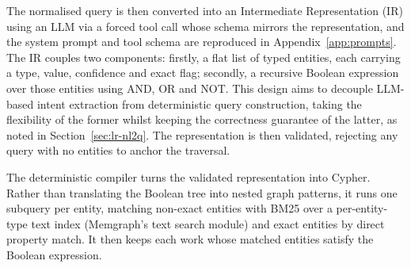 The normalised query is then converted into an Intermediate Representation (IR) using an LLM via a forced tool call whose schema mirrors the representation, and the system prompt and tool schema are reproduced in Appendix~\ref{app:prompts}. The IR couples two components: firstly, a flat list of typed entities, each carrying a type, value, confidence and exact flag; secondly, a recursive Boolean expression over those entities using AND, OR and NOT. This design aims to decouple LLM-based intent extraction from deterministic query construction, taking the flexibility of the former whilst keeping the correctness guarantee of the latter, as noted in Section~\ref{sec:lr-nl2q}. The representation is then validated, rejecting any query with no entities to anchor the traversal.

The deterministic compiler turns the validated representation into Cypher. Rather than translating the Boolean tree into nested graph patterns, it runs one subquery per entity, matching non-exact entities with BM25 over a per-entity-type text index (Memgraph's text search module) and exact entities by direct property match. It then keeps each work whose matched entities satisfy the Boolean expression.

